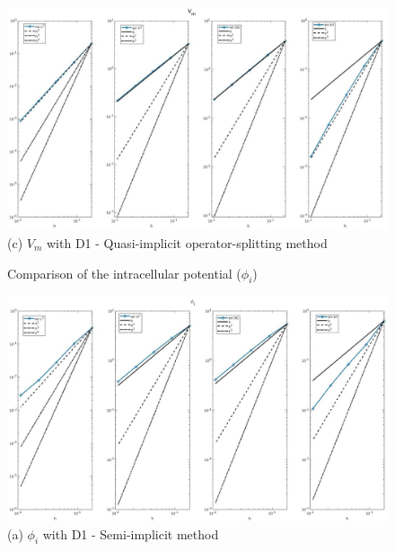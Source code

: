 \documentclass[a4paper,11pt]{article}
\begin{document}
\begin{figure}[h]
\begin{center}
\includegraphics[width =\textwidth]{./D1_Vm_1_OS.jpg}
\caption*{(c) $V_m$ with D1 - Quasi-implicit operator-splitting method}
\end{center}
\end{figure}

\begin{figure}[H]
\caption{Comparison of the intracellular potential ($\phi_i$)}
\label{pi-time}
\begin{center}
\includegraphics[width = \textwidth]{./D1_Phii_1.jpg}
\caption*{(a) $\phi_i$ with D1 - Semi-implicit method}
\end{center}
\end{figure}
\newpage
\end{document}
